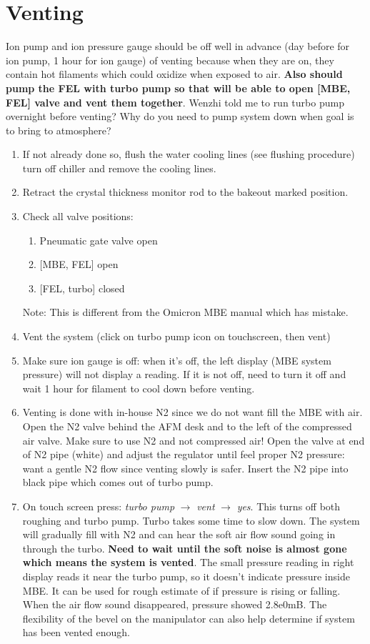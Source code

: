 \section{Venting}
Ion pump and ion pressure gauge should be off well in advance (day before for ion pump, 1 hour for ion gauge) of venting because when they are on, they contain hot filaments which could oxidize when exposed to air. \textbf{Also should pump the FEL with turbo pump so that will be able to open [MBE, FEL] valve and vent them together}. Wenzhi told me to run turbo pump overnight before venting? Why do you need to pump system down when goal is to bring to atmosphere?
\begin{enumerate}
\item	If not already done so, flush the water cooling lines (see flushing procedure) turn off chiller and remove the cooling lines.
\item	Retract the crystal thickness monitor rod to the bakeout marked position.
\item Check all valve positions: 
\begin{enumerate}
	\item Pneumatic gate valve open
	\item {[MBE, FEL]} open    %
	\item {[FEL, turbo]} closed
\end{enumerate}
Note: This is different from the Omicron MBE manual which has mistake.
\item	Vent the system (click on turbo pump icon on touchscreen, then vent)
\item	Make sure ion gauge is off: when it’s off, the left display (MBE system pressure) will not display a reading. If it is not off, need to turn it off and wait 1 hour for filament to cool down before venting.
\item	Venting is done with in-house N2 since we do not want fill the MBE with air. Open the N2 valve behind the AFM desk and to the left of the compressed air valve. Make sure to use N2 and not compressed air! Open the valve at end of N2 pipe (white) and adjust the regulator until feel proper N2 pressure: want a gentle N2 flow since venting slowly is safer. Insert the N2 pipe into black pipe which comes out of turbo pump.
\item	On touch screen press: \emph{turbo pump} $\rightarrow$ \emph{vent} $\rightarrow$ \emph{yes}. This turns off both roughing and turbo pump. Turbo takes some time to slow down. The system will gradually fill with N2 and can hear the soft air flow sound going in through the turbo. \textbf{Need to wait until the soft noise is almost gone which means the system is vented}. The small pressure reading in right display reads it near the turbo pump, so it doesn’t indicate pressure inside MBE. It can be used for rough estimate of if pressure is rising or falling. When the air flow sound disappeared, pressure showed 2.8e0mB. The flexibility of the bevel on the manipulator can also help determine if system has been vented enough.
\end{enumerate}


